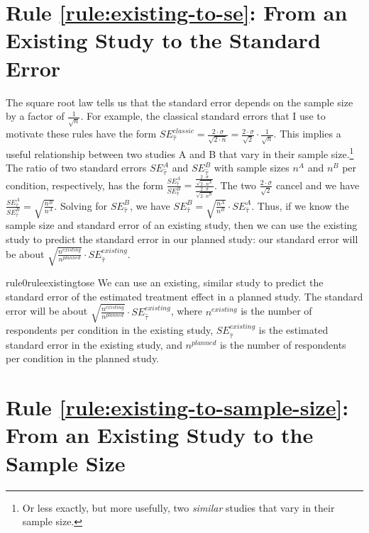 \documentclass[12pt]{article}
\begin{document}
\section*{Rule \ref{rule:existing-to-se}: From an Existing Study to the Standard Error}

The square root law tells us that the standard error depends on the sample size by a factor of $\frac{1}{\sqrt{n}}$. 
For example, the classical standard errors that I use to motivate these rules have the form $SE_{\widehat{\tau}}^{classic} = \frac{2 \cdot \sigma}{\sqrt{2 \cdot n}} = \frac{2 \cdot \sigma}{\sqrt{2}} \cdot \frac{1}{\sqrt{n}}$.
This implies a useful relationship between two studies A and B that vary in their sample size.\footnote{Or less exactly, but more usefully, two \emph{similar} studies that vary in their sample size.} 
The ratio of two standard errors ${SE}_{\widehat{\tau}}^{A}$ and ${SE}_{\widehat{\tau}}^{B}$ with sample sizes $n^{A}$ and $n^{B}$ per condition, respectively, has the form $\frac{SE_{\widehat{\tau}}^{A}}{SE_{\widehat{\tau}}^{B}} = \frac{\frac{2 \cdot \sigma}{\sqrt{{2 \cdot n}^{A}}}}{\frac{2 \cdot \sigma}{\sqrt{{2 \cdot n}^{B}}}}$.
The two $\frac{2 \cdot \sigma}{\sqrt{2}}$ cancel and we have $\frac{SE_{\widehat{\tau}}^{A}}{SE_{\widehat{\tau}}^{B}} = \sqrt{\frac{n^{B}}{n^{A}}}$.
Solving for $SE_{\widehat{\tau}}^{B}$, we have $SE_{\widehat{\tau}}^{B} = \sqrt{\frac{n^{A}}{n^{B}}} \cdot SE_{\widehat{\tau}}^{A}$.
Thus, if we know the sample size and standard error of an existing study, then we can use the existing study to predict the standard error in our planned study: our standard error will be about $\sqrt{\frac{n^{existing}}{n^{planned}}} \cdot SE_{\widehat{\tau}}^{existing}$.

\begin{restatable}{rule0}{ruleexistingtose}
\label{rule:existing-to-se}
We can use an existing, similar study to predict the standard error of the estimated treatment effect in a planned study. The standard error will be about $\sqrt{\frac{n^{existing}}{n^{planned}}} \cdot SE_{\widehat{\tau}}^{existing}$, where $n^{existing}$ is the number of respondents per condition in the existing study, $SE_{\widehat{\tau}}^{existing}$ is the estimated standard error in the existing study, and $n^{planned}$ is the number of respondents per condition in the planned study. 
\end{restatable}

\section*{Rule \ref{rule:existing-to-sample-size}: From an Existing Study to the Sample Size}
\end{document}
